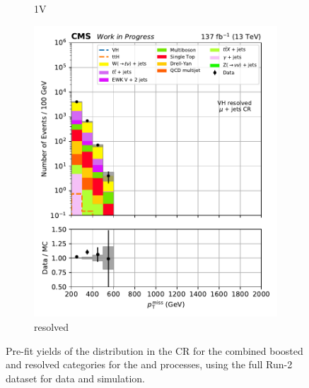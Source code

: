 \begin{figure}[htbp]
\begin{subfigure}[b]{0.24\textwidth}
        \caption{\VH 1V}
    \end{subfigure}
    \hfill
    \begin{subfigure}[b]{0.24\textwidth}
        \includegraphics[width=\textwidth]{figures/region_plots/full_Run2/region_1/VH_resolved.pdf}
        \caption{\VH resolved}
    \end{subfigure}
    \caption[Pre-fit yields of the \ptmiss distribution in the \singleMuCr control region for the combined boosted and resolved categories for the \ttH and \VH processes, using the full Run-2 dataset for data and simulation]{Pre-fit yields of the \ptmiss distribution in the \singleMuCr \gls{CR} for the combined boosted and resolved categories for the \ttH and \VH processes, using the full Run-2 dataset for data and simulation.}
    \label{fig:htoinv_cr_yields_comb2016to18_single_muon}
\end{figure}

